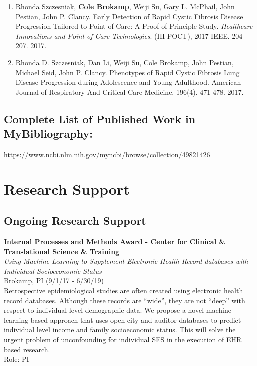 \documentclass{nihbiosketch}
\begin{document}
\begin{enumerate}
\begin{enumerate}
	\item Rhonda Szczesniak, \textbf{Cole Brokamp}, Weiji Su, Gary L. McPhail, John Pestian, John P. Clancy. Early Detection of Rapid Cystic Fibrosis Disease Progression Tailored to Point of Care: A Proof-of-Principle Study. \textit{Healthcare Innovations and Point of Care Technologies}. (HI-POCT), 2017 IEEE. 204-207. 2017.

	\item Rhonda D. Szczesniak, Dan Li, Weiji Su, Cole Brokamp, John Pestian, Michael Seid, John P. Clancy. Phenotypes of Rapid Cystic Fibrosis Lung Disease Progression during Adolescence and Young Adulthood. American Journal of Respiratory And Critical Care Medicine. 196(4). 471-478. 2017.
	
\end{enumerate}

\end{enumerate}

\subsection*{Complete List of Published Work in MyBibliography:} 
\url{https://www.ncbi.nlm.nih.gov/myncbi/browse/collection/49821426}



\section{Research Support}

\subsection*{Ongoing Research Support}

\bigskip

\textbf{Internal Processes and Methods Award - Center for Clinical \&
	Translational Science \& Training}\\
\emph{Using Machine Learning to Supplement Electronic Health Record
	databases with Individual Socioeconomic Status}\\
Brokamp, PI (9/1/17 - 6/30/19)\\
Retrospective epidemiological studies are often created using electronic
health record databases. Although these records are ``wide'', they are
not ``deep'' with respect to individual level demographic data. We
propose a novel machine learning based approach that uses open city and
auditor databases to predict individual level income and family
socioeconomic status. This will solve the urgent problem of
unconfounding for individual SES in the execution of EHR based
research.\\
Role: PI
\end{document}
